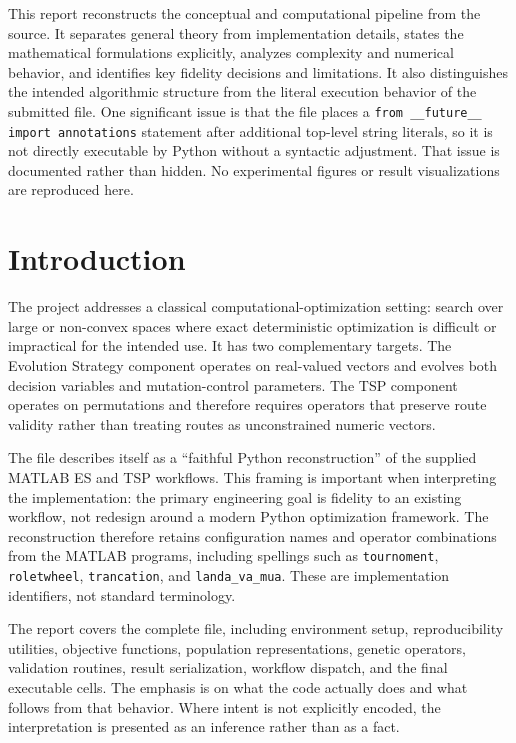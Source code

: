 \documentclass[11pt,a4paper]{article}
\newcommand{\code}[1]{\texttt{#1}}
\begin{document}
This report reconstructs the conceptual and computational pipeline from the source. It separates general theory from implementation details, states the mathematical formulations explicitly, analyzes complexity and numerical behavior, and identifies key fidelity decisions and limitations. It also distinguishes the intended algorithmic structure from the literal execution behavior of the submitted file. One significant issue is that the file places a \code{from \_\_future\_\_ import annotations} statement after additional top-level string literals, so it is not directly executable by Python without a syntactic adjustment. That issue is documented rather than hidden. No experimental figures or result visualizations are reproduced here.

\section{Introduction}
The project addresses a classical computational-optimization setting: search over large or non-convex spaces where exact deterministic optimization is difficult or impractical for the intended use. It has two complementary targets. The Evolution Strategy component operates on real-valued vectors and evolves both decision variables and mutation-control parameters. The TSP component operates on permutations and therefore requires operators that preserve route validity rather than treating routes as unconstrained numeric vectors.

The file describes itself as a ``faithful Python reconstruction'' of the supplied MATLAB ES and TSP workflows. This framing is important when interpreting the implementation: the primary engineering goal is fidelity to an existing workflow, not redesign around a modern Python optimization framework. The reconstruction therefore retains configuration names and operator combinations from the MATLAB programs, including spellings such as \code{tournoment}, \code{roletwheel}, \code{trancation}, and \code{landa\_va\_mua}. These are implementation identifiers, not standard terminology.

The report covers the complete file, including environment setup, reproducibility utilities, objective functions, population representations, genetic operators, validation routines, result serialization, workflow dispatch, and the final executable cells. The emphasis is on what the code actually does and what follows from that behavior. Where intent is not explicitly encoded, the interpretation is presented as an inference rather than as a fact.
\end{document}
